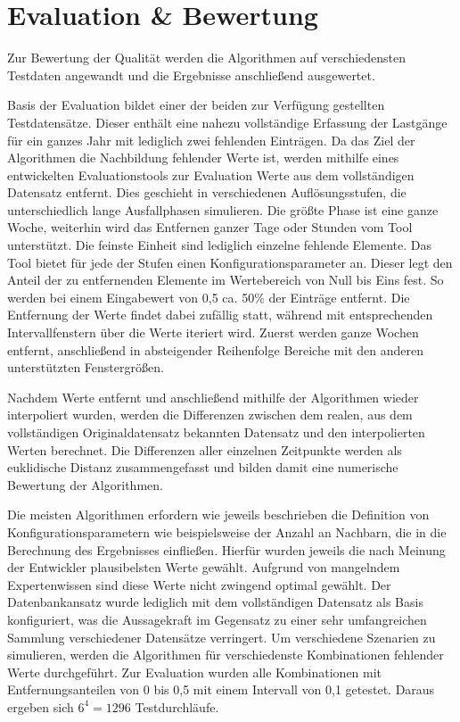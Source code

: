 
\section{Evaluation \& Bewertung}

Zur Bewertung der Qualität werden die Algorithmen auf verschiedensten Testdaten angewandt und die Ergebnisse anschließend ausgewertet.

Basis der Evaluation bildet einer der beiden zur Verfügung gestellten Testdatensätze. Dieser enthält eine nahezu vollständige Erfassung der Lastgänge für ein ganzes Jahr mit lediglich zwei fehlenden Einträgen. Da das Ziel der Algorithmen die Nachbildung fehlender Werte ist, werden mithilfe eines entwickelten Evaluationstools zur Evaluation Werte aus dem vollständigen Datensatz entfernt. Dies geschieht in verschiedenen Auflösungsstufen, die unterschiedlich lange Ausfallphasen simulieren. Die größte Phase ist eine ganze Woche, weiterhin wird das Entfernen ganzer Tage oder Stunden vom Tool unterstützt. Die feinste Einheit sind lediglich einzelne fehlende Elemente. Das Tool bietet für jede der Stufen einen Konfigurationsparameter an. Dieser legt den Anteil der zu entfernenden Elemente im Wertebereich von Null bis Eins fest. So werden bei einem Eingabewert von 0,5 ca. 50\% der Einträge entfernt. Die Entfernung der Werte findet dabei zufällig statt, während mit entsprechenden Intervallfenstern über die Werte iteriert wird. Zuerst werden ganze Wochen entfernt, anschließend in absteigender Reihenfolge Bereiche mit den anderen unterstützten Fenstergrößen.

Nachdem Werte entfernt und anschließend mithilfe der Algorithmen wieder interpoliert wurden, werden die Differenzen zwischen dem realen, aus dem vollständigen Originaldatensatz bekannten Datensatz und den interpolierten Werten berechnet. Die Differenzen aller einzelnen Zeitpunkte werden als euklidische Distanz zusammengefasst und bilden damit eine numerische Bewertung der Algorithmen.

Die meisten Algorithmen erfordern wie jeweils beschrieben die Definition von Konfigurationsparametern wie beispielsweise der Anzahl an Nachbarn, die in die Berechnung des Ergebnisses einfließen. Hierfür wurden jeweils die nach Meinung der Entwickler plausibelsten Werte gewählt. Aufgrund von mangelndem Expertenwissen sind diese Werte nicht zwingend optimal gewählt. Der Datenbankansatz wurde lediglich mit dem vollständigen Datensatz als Basis konfiguriert, was die Aussagekraft im Gegensatz zu einer sehr umfangreichen Sammlung verschiedener Datensätze verringert.
Um verschiedene Szenarien zu simulieren, werden die Algorithmen für verschiedenste Kombinationen fehlender Werte durchgeführt. Zur Evaluation wurden alle Kombinationen mit Entfernungsanteilen von 0 bis 0,5 mit einem Intervall von 0,1 getestet. Daraus ergeben sich $ 6 ^ 4 = 1296 $ Testdurchläufe.

